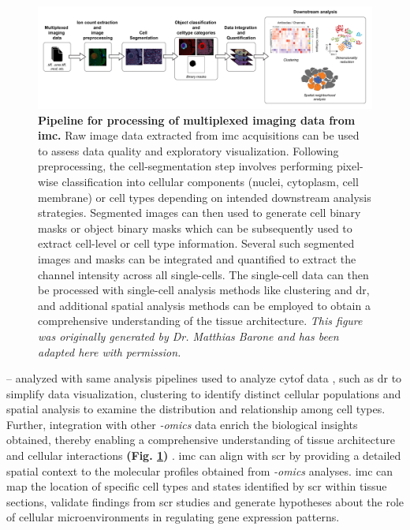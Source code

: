 \begin{figure}[H]
    \centering
    \includegraphics[width=\linewidth]{Chapter1/Fig/F1-14-01.png}
    \caption[Overview of  data analysis workflow]{\textbf{Pipeline for processing of multiplexed imaging data from \gls{imc}.} Raw image data extracted from \gls{imc} acquisitions can be used to assess data quality and exploratory visualization. Following preprocessing, the cell-segmentation step involves performing pixel-wise classification into cellular components (nuclei, cytoplasm, cell membrane) or cell types depending on intended downstream analysis strategies. Segmented images can then used to generate cell binary masks or object binary masks which can be subsequently used to extract cell-level or cell type information. Several such segmented images and masks can be integrated and quantified to extract the channel intensity across all single-cells. The single-cell data can then be processed with single-cell analysis methods like clustering and \gls{dr}, and additional spatial analysis methods can be employed to obtain a comprehensive understanding of the tissue architecture. \textit{This figure was originally generated by Dr. Matthias Barone and has been adapted here with permission.}}
    \label{fig:chp1_imc_analysis}
\end{figure}


 -- analyzed with same analysis pipelines used to analyze \gls{cytof} data \textbf{\cite{veenstra_research_2021}}, such as \gls{dr} to simplify data visualization, clustering to identify distinct cellular populations and spatial analysis to examine the distribution and relationship among cell types. Further, integration with other \textit{-omics} data enrich the biological insights obtained, thereby enabling a comprehensive understanding of tissue architecture and cellular interactions \textbf{(Fig. \ref{fig:chp1_imc_analysis})} \textbf{\cite{veenstra_research_2021}}. \gls{imc} can align with \gls{scr} by providing a detailed spatial context to the molecular profiles obtained from \textit{-omics} analyses. \gls{imc} can map the location of specific cell types and states identified by \gls{scr} within tissue sections, validate findings from \gls{scr} studies and generate hypotheses about the role of cellular microenvironments in regulating gene expression patterns.\\

